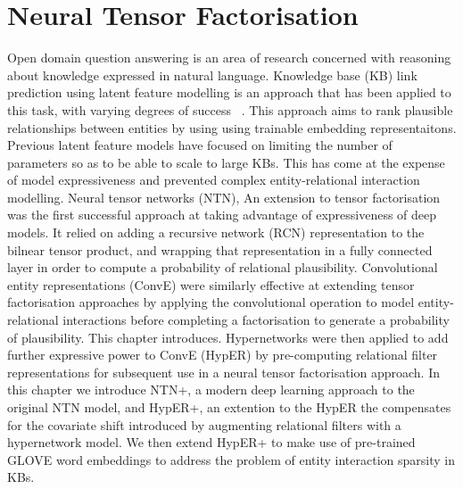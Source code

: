 \chapter{Neural Tensor Factorisation}


\ifpdf
    \graphicspath{{Chapter3/Figs/Raster/}{Chapter3/Figs/PDF/}{Chapter3/Figs/}}
\else
    \graphicspath{{Chapter3/Figs/Vector/}{Chapter3/Figs/}}
\fi


Open domain question answering is an area of research concerned with reasoning about knowledge expressed in natural language. Knowledge base (KB) link prediction using latent feature modelling is an approach that has been applied to this task, with varying degrees of success  ~\citep{nguyen2017novel, diefenbach2018wdaqua, kristiadi2019incorporating}. This approach aims to rank plausible relationships between entities by using using trainable embedding representaitons. Previous latent feature models have focused on limiting the number of parameters so as to be able to scale to large KBs. This has come at the expense of model expressiveness and prevented complex entity-relational interaction modelling. Neural tensor networks (NTN), An extension to tensor factorisation was the first successful approach at taking advantage of expressiveness of deep models. It relied on adding a recursive network (RCN) representation to the bilnear tensor product, and wrapping that representation in a fully connected layer in order to compute a probability of relational plausibility. Convolutional entity representations (ConvE) were similarly effective at extending tensor factorisation approaches by applying the convolutional operation to model entity-relational interactions before completing a factorisation to generate a probability of plausibility. This chapter introduces. Hypernetworks were then applied to add further expressive power to ConvE (HypER) by pre-computing relational filter representations for subsequent use in a neural tensor factorisation approach. In this chapter we introduce NTN+, a modern deep learning approach to the original NTN model, and HypER+, an extention to the HypER the compensates for the covariate shift introduced by augmenting relational filters with a hypernetwork model. We then extend HypER+ to make use of pre-trained GLOVE word embeddings to address the problem of entity interaction sparsity in KBs.


